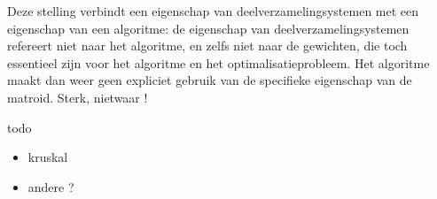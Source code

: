 Deze stelling verbindt een eigenschap van deelverzamelingsystemen met
een eigenschap van een algoritme: de eigenschap van
deelverzamelingsystemen refereert niet naar het algoritme, en zelfs
niet naar de gewichten, die toch essentieel zijn voor het algoritme en
het optimalisatieprobleem. Het algoritme maakt dan weer geen expliciet
gebruik van de specifieke eigenschap van de matroid. Sterk, nietwaar !

todo
\begin{itemize}
\item 
kruskal
\item 
andere ?
\end{itemize}
